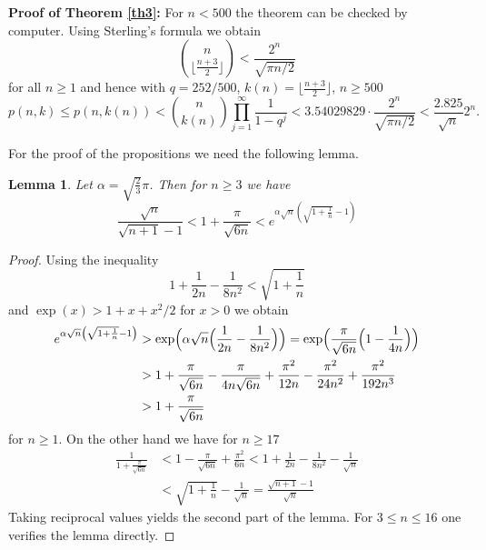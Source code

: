 \documentclass[12pt]{amsart}
\newtheorem{lem}[thm]{Lemma}
\theoremstyle{definition}
\theoremstyle{remark}
\newcommand{\al}{\alpha}
\begin{document}
{\bf Proof of Theorem \ref{th3}:} For $n<500$ the theorem can be checked by
computer. Using Sterling's formula we obtain
\begin{equation*}
\binom{n}{\lfloor\frac{n+3}{2}\rfloor}< \frac{2^n}{\sqrt{\pi n/2}}
\end{equation*}    
for all $n\ge 1$ and hence with $q=252/500$, $k(n)=\lfloor\frac{n+3}{2}\rfloor$,
$n\ge 500$
\begin{equation*}
p(n,k)\le p(n,k(n))<\binom{n}{k(n)}
\prod_{j=1}^{\infty}\frac{1}{1-q^j}< 3.54029829\cdot\frac{2^n}{\sqrt{\pi n/2}}<
\frac{2.825}{\sqrt{n}}2^n.
\end{equation*}

For the proof of the propositions we need the following lemma.

\begin{lem}\label{13}
Let $\al=\sqrt{\frac{2}{3}}\pi$. Then for $n\ge 3$ we have
\begin{equation*}
\frac{\sqrt{n}}{\sqrt{n+1}-1}<
1+\frac{\pi}{\sqrt{6n}}<
e^{\al\sqrt{n}\left(\sqrt{1+\frac{1}{n}}-1\right)}
\end{equation*}
\end{lem}

\begin{proof}
Using the inequality
$$1+\frac{1}{2n}-\frac{1}{8n^2}<\sqrt{1+\frac{1}{n}}$$
and $\exp(x)>1+x+x^2/2$ for $x>0$
we obtain
\begin{align*}
e^{\al\sqrt{n}\left(\sqrt{1+\frac{1}{n}}-1\right)} & >
\exp \Bigl(\al\sqrt{n}\Bigl(\frac{1}{2n}-\frac{1}{8n^2}\Bigr)\Bigr) =
\exp \Bigl(\frac{\pi}{\sqrt{6n}}\Bigl(1-\frac{1}{4n}\Bigr)\Bigr)\\
 & > 1+\frac{\pi}{\sqrt{6n}}-\frac{\pi}{4n\sqrt{6n}}
+\frac{\pi^2}{12n}-\frac{\pi^2}{24n^2}
+\frac{\pi^2}{192n^3}\\
 & > 1+\frac{\pi}{\sqrt{6n}}
\end{align*}
for $n\ge 1$. On the other hand we have for $n\ge 17$
\begin{align*}
\frac{1}{1+\frac{\pi}{\sqrt{6n}}} & < 
1-\frac{\pi}{\sqrt{6n}}+\frac{\pi^2}{6n} < 1+\frac{1}{2n}-
\frac{1}{8n^2}-\frac{1}{\sqrt{n}}\\
 & < \sqrt{1+\frac{1}{n}}-\frac{1}{\sqrt{n}}=\frac{\sqrt{n+1}-1}{\sqrt{n}}
\end{align*}
Taking reciprocal values yields the second part of the lemma. For
$3\le n\le 16$ one verifies the lemma directly.
\end{proof} 
\end{document}
